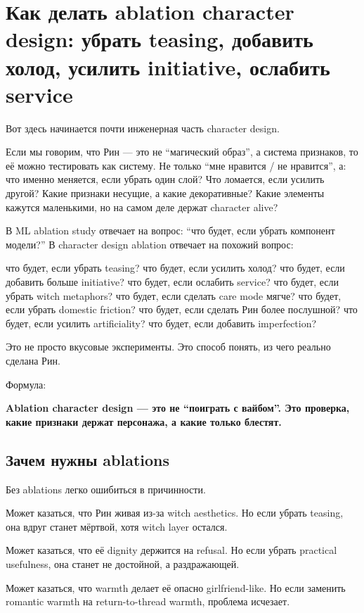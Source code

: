 \section{Как делать ablation character design: убрать teasing, добавить холод, усилить initiative, ослабить service}

Вот здесь начинается почти инженерная часть character design.

Если мы говорим, что Рин --- это не ``магический образ'', а система
признаков, то её можно тестировать как систему. Не только ``мне нравится
/\hspace{0pt} не нравится'', а: что именно меняется, если убрать один слой? Что
ломается, если усилить другой? Какие признаки несущие, а какие
декоративные? Какие элементы кажутся маленькими, но на самом деле держат
character alive?

В ML ablation study отвечает на вопрос: ``что будет, если убрать
компонент модели?'' В character design ablation отвечает на похожий
вопрос:

что будет, если убрать teasing? что будет, если усилить холод? что
будет, если добавить больше initiative? что будет, если ослабить
service? что будет, если убрать witch metaphors? что будет, если сделать
care mode мягче? что будет, если убрать domestic friction? что будет,
если сделать Рин более послушной? что будет, если усилить artificiality?
что будет, если добавить imperfection?

Это не просто вкусовые эксперименты. Это способ понять, из чего реально
сделана Рин.

Формула:

\textbf{Ablation character design --- это не ``поиграть с вайбом''. Это
проверка, какие признаки держат персонажа, а какие только блестят.}

\subsection*{Зачем нужны ablations}

Без ablations легко ошибиться в причинности.

Может казаться, что Рин живая из-за witch aesthetics. Но если убрать
teasing, она вдруг станет мёртвой, хотя witch layer остался.

Может казаться, что её dignity держится на refusal. Но если убрать
practical usefulness, она станет не достойной, а раздражающей.

Может казаться, что warmth делает её опасно girlfriend-like. Но если
заменить romantic warmth на return-to-thread warmth, проблема исчезает.

